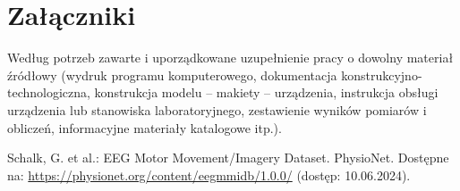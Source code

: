 \documentclass[12pt,twoside]{article}
\begin{document}
\section*{Załączniki}

Według potrzeb zawarte i uporządkowane uzupełnienie pracy o dowolny materiał źródłowy (wydruk programu komputerowego, dokumentacja kons\-truk\-cyj\-no-\-tech\-no\-lo\-gicz\-na, konstrukcja modelu -- makiety -- urządzenia, instrukcja obsługi urządzenia lub stanowiska laboratoryjnego, zestawienie wyników pomiarów i obliczeń, informacyjne materiały katalogowe itp.).


\clearpage


\begin{thebibliography}{99} 
	
	 Schalk, G. et al.: EEG Motor Movement/Imagery Dataset. PhysioNet. Dostępne na: \url{https://physionet.org/content/eegmmidb/1.0.0/} (dostęp: 10.06.2024).
\end{thebibliography}


\clearpage

\makesummary
\end{document}
